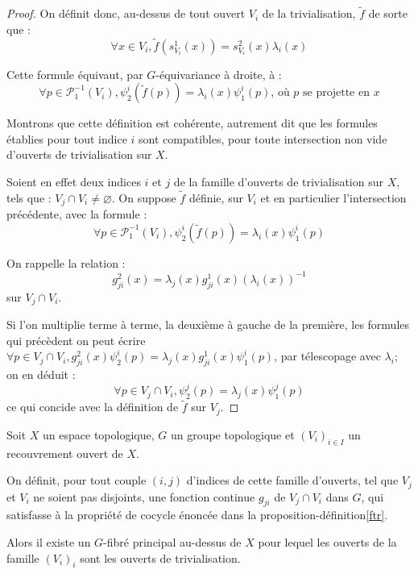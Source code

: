 \begin{proof}
\par
On définit donc, au-dessus de tout ouvert $V_i$ de la trivialisation, $\tilde{f}$ de sorte que :
\[\forall x \in V_i , \tilde{f}(s^1_{V_i}(x)) = s^2_{V_i}(x) \lambda_i(x)\]

Cette formule équivaut, par $G$-équivariance à droite, à :
\[\forall p \in \mathcal{P}_1^{-1}(V_i) , \psi_2^i(\tilde{f}(p)) = \lambda_i (x) \psi_1^i(p)\text{, où $p$ se projette en }x\]

Montrons que cette définition est cohérente, %
autrement dit que les formules établies pour tout indice $i$ sont compatibles, %
pour toute intersection non vide d'ouverts de trivialisation sur $X$.

\par
Soient en effet deux indices $i$ et $j$ de la famille d'ouverts de trivialisation sur $X$, tels que : $V_j \cap V_i \neq \varnothing$. %
On suppose $\tilde{f}$ définie, sur $V_i$ et en particulier l'intersection précédente, avec la formule :
\[\forall p \in \mathcal{P}_1^{-1}(V_i) , \psi_2^i(\tilde{f}(p)) = \lambda_i (x) \psi_1^i(p)\]

On rappelle la relation :
\[g^2_{ji}(x) = \lambda_j(x) g^1_{ji}(x) (\lambda_i(x))^{-1}\]
sur $V_j \cap V_i$.

\par
Si l'on multiplie terme à terme, la deuxième à gauche de la première, les formules qui précèdent on peut écrire %
$\forall p \in V_j \cap V_i , g^2_{ji}(x) \psi_2^i(p) = \lambda_j(x) g^1_{ji}(x) \psi_1^i(p)$, par télescopage avec $\lambda_i$; on en déduit :
\[\forall p \in V_j \cap V_i , \psi_2^j(p) = \lambda_j(x) \psi_1^j(p)\]
ce qui concide avec la d\'efinition de $\tilde{f}$ sur $V_j$.
\end{proof}


\begin{theo}
Soit $X$ un espace topologique, $G$ un groupe topologique et $(V_i)_{i \in I}$ un recouvrement ouvert de $X$.

\par
On d\'efinit, pour tout couple $(i,j)$ d'indices de cette famille d'ouverts, tel que $V_j$ et  $V_i$ ne soient pas disjoints, %
une fonction continue $g_{ji}$ de $V_j \cap V_i$ dans $G$, qui satisfasse à la propri\'et\'e de cocycle énoncée dans la proposition-définition\ref{ftr}.

\par
Alors il existe un $G$-fibré principal au-dessus de $X$ pour lequel les ouverts de la famille $(V_i)_i$ sont les ouverts de trivialisation.
\end{theo}

